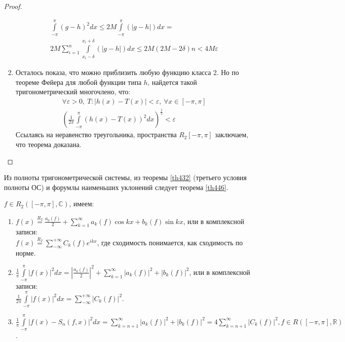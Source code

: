 \begin{proof}
\begin{enumerate}
\begin{gather}
          \int\limits_{-\pi}^\pi (g - h)^2 dx \leq 2M
          \int\limits_{-\pi}^\pi (|g - h|) dx = \\ 2M \sum\limits_{i = 1}^{n}
          \int\limits_{x_i - \delta}^{x_i + \delta} (|g - h|)dx \leq 2M (2M -
          2\delta)n < 4M\varepsilon
        \end{gather}
      \item Осталось показа, что можно приблизить любую функцию класса 2. Но по
        теореме Фейера для любой функции типа $h$, найдется такой
        тригонометрический многочлено, что:
        \begin{gather*}
          \forall \varepsilon > 0, \ T: |h(x) - T(x)| < \varepsilon, \ \forall
          x \in [-\pi, \pi] \\
          \left(\frac{1}{2\pi} \int\limits_{-\pi}^\pi (h(x) - T(x))^2 dx
          \right)^{\frac{1}{2}} < \varepsilon
        \end{gather*}
        Ссылаясь на неравенство треугольника, пространства $R_2[-\pi, \pi]$
        заключаем, что теорема доказана.
  \end{enumerate}
\end{proof}

Из полноты тригонометрической системы, из теоремы \eqref{th432} (третьего
условия полноты ОС) и форумлы наименьших уклонений следует теорема
\eqref{th446}.

\begin{theorem}
  \label{th446}
  $f \in R_2([-\pi, \pi], \mathbb{C})$, имеем:
  \begin{enumerate}
    \item $f(x) \overset{R_2}=\frac{a_0(f)}{2} + \sum\limits_{k = 1}^{\infty}
      a_k(f) \cos kx + b_k(f) \sin kx$, или в комплексной записи: \\
      $f(x) \overset{R_2}= \sum\limits_{-\infty}^{+\infty} C_k(f) e^{ikx}$, где
      сходимость понимается, как сходимость по норме.
    \item $\frac{1}{\pi} \int\limits_{-\pi}^\pi |f(x)|^2 dx =
      |\frac{a_0(f)}{2}|^2 + \sum\limits_{k = 1}^{\infty} |a_k(f)|^2 +
      |b_k(f)|^2$, или в комплексной записи:\\
      $\frac{1}{2\pi} \int\limits_{-\pi}^\pi |f(x)|^2 dx =
      \sum\limits_{-\infty}^{+\infty} |C_k(f)|^2$.
    \item $\frac{1}{\pi}\int\limits_{-\pi}^\pi |f(x) - S_n(f, x)|^2 dx =
      \sum\limits_{k = n + 1}^{\infty} |a_k(f)|^2 + |b_k(f)|^2 = 4
      \sum\limits_{k = n + 1}^{\infty} |C_k(f)|^2, f \in R([-\pi, \pi],
      \mathbb{R})$.
  \end{enumerate}
\end{theorem}

